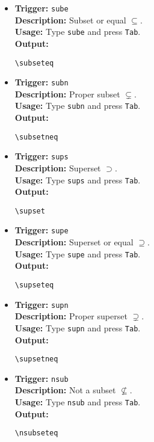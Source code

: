 \documentclass{article}
\begin{document}
\begin{itemize}[leftmargin=*, label={}]
\item \textbf{Trigger:} \texttt{sube} \\
\textbf{Description:} Subset or equal \(\subseteq\). \\
\textbf{Usage:} Type \texttt{sube} and press \texttt{Tab}. \\
\textbf{Output:}
\begin{verbatim}
\subseteq 
\end{verbatim}

\item \textbf{Trigger:} \texttt{subn} \\
\textbf{Description:} Proper subset \(\subsetneq\). \\
\textbf{Usage:} Type \texttt{subn} and press \texttt{Tab}. \\
\textbf{Output:}
\begin{verbatim}
\subsetneq 
\end{verbatim}

\item \textbf{Trigger:} \texttt{sups} \\
\textbf{Description:} Superset \(\supset\). \\
\textbf{Usage:} Type \texttt{sups} and press \texttt{Tab}. \\
\textbf{Output:}
\begin{verbatim}
\supset 
\end{verbatim}

\item \textbf{Trigger:} \texttt{supe} \\
\textbf{Description:} Superset or equal \(\supseteq\). \\
\textbf{Usage:} Type \texttt{supe} and press \texttt{Tab}. \\
\textbf{Output:}
\begin{verbatim}
\supseteq 
\end{verbatim}

\item \textbf{Trigger:} \texttt{supn} \\
\textbf{Description:} Proper superset \(\supsetneq\). \\
\textbf{Usage:} Type \texttt{supn} and press \texttt{Tab}. \\
\textbf{Output:}
\begin{verbatim}
\supsetneq 
\end{verbatim}

\item \textbf{Trigger:} \texttt{nsub} \\
\textbf{Description:} Not a subset \(\nsubseteq\). \\
\textbf{Usage:} Type \texttt{nsub} and press \texttt{Tab}. \\
\textbf{Output:}
\begin{verbatim}
\nsubseteq 
\end{verbatim}


\end{itemize}
\end{document}

